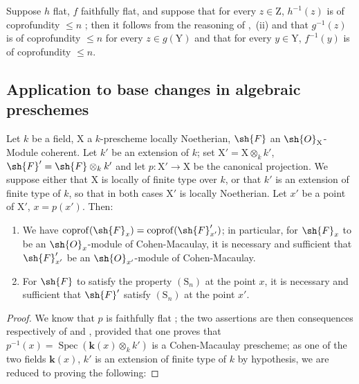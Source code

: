 \begin{remark}[6.6.2]
\label{IV.6.6.2}
Suppose $h$ flat, $f$ faithfully flat, and suppose that for every $z\in\mathrm{Z}$, $h^{-1}(z)$ is of coprofundity $\leqslant n$ ; then it follows from the reasoning of ,~(ii) and  that $g^{-1}(z)$ is of coprofundity $\leqslant n$ for every $z\in g(\mathrm{Y})$ and that for every $y\in\mathrm{Y}$, $f^{-1}(y)$ is of coprofundity $\leqslant n$.
\end{remark}

\subsection{Application to base changes in algebraic preschemes}
\label{subsection:IV.6.7}

\begin{proposition}[6.7.1]
\label{IV.6.7.1}
Let $k$ be a field, $\mathrm{X}$ a $k$-prescheme locally Noetherian, $\sh{F}$ an $\sh{O}_\mathrm{X}$-Module coherent. Let $k'$ be an extension of $k$; set $\mathrm{X}'=\mathrm{X}\otimes_k k'$, $\sh{F}'=\sh{F}\otimes_k k'$ and let $p:\mathrm{X}'\to\mathrm{X}$ be the canonical projection. We suppose either that $\mathrm{X}$ is locally of finite type over $k$, or that $k'$ is an extension of finite type of $k$, so that in both cases $\mathrm{X}'$ is locally Noetherian. Let $x'$ be a point of $\mathrm{X}'$, $x=p(x')$. Then:
\begin{enumerate}[label=(\roman*)]
  \item We have $\operatorname{coprof}(\sh{F}_x)=\operatorname{coprof}(\sh{F}'_{x'})$; in particular, for $\sh{F}_x$ to be an $\sh{O}_x$-module of Cohen-Macaulay, it is necessary and sufficient that $\sh{F}'_{x'}$ be an $\sh{O}_{x'}$-module of Cohen-Macaulay.
  \item For $\sh{F}$ to satisfy the property $(\mathrm{S}_n)$ at the point $x$, it is necessary and sufficient that $\sh{F}'$ satisfy $(\mathrm{S}_n)$ at the point $x'$.
\end{enumerate}
\end{proposition}

\begin{proof}
We know that $p$ is faithfully flat ; the two assertions are then consequences respectively of  and , provided that one proves that $p^{-1}(x)=\operatorname{Spec}(\boldsymbol{k}(x)\otimes_k k')$ is a Cohen-Macaulay prescheme; as one of the two fields $\boldsymbol{k}(x)$, $k'$ is an extension of finite type of $k$ by hypothesis, we are reduced to proving the following:
\end{proof}

